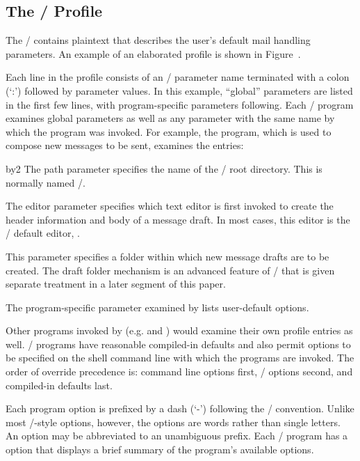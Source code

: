 \subsection{The \MH/ Profile}
The \profile/ contains plaintext that describes the user's default mail
handling parameters.
An example of an elaborated profile is shown in Figure~\elab.

Each line in the profile consists of an \MH/ parameter name terminated
with a colon (`:') followed by parameter values.
In this example,
``global'' parameters are listed in the first few lines,
with program-specific parameters following.
Each \MH/ program examines global parameters as well as any parameter
with the same name by which the program was invoked.
For example,
the  program, which is used to compose new messages to be sent,
examines the entries:
\medskip
{\advance\leftskip by2\parindent
{}
The path parameter specifies the name of the \MH/ root directory.
This is normally named \Mail/.

The editor parameter specifies which text editor is first invoked to create
the header information and body of a message draft.
In most cases, this editor is the \MH/ default editor, .

This parameter specifies a folder within which new message drafts
are to be created.
The draft folder mechanism is an advanced feature of \MH/ that is
given separate treatment in a later segment of this paper.

The program-specific parameter examined by  lists
user-default options.
\par}
\medskip

\noindent
Other programs invoked by 
(e.g.  and ) would examine their own profile 
entries as well.
\MH/ programs have reasonable compiled-in defaults and also permit options to
be specified on the shell command line with which the programs are invoked.
The order of override precedence is: command line options first,
\profile/ options second, and compiled-in defaults last.

Each program option is prefixed by a dash (`-') following the \unix/
convention.
Unlike most \unix/-style options,
however, the options are words rather than single letters.
An option may be abbreviated to an unambiguous prefix.
Each \MH/ program has a  option that
displays a brief summary of the program's available options.


